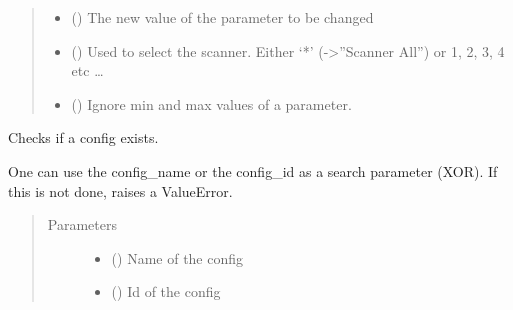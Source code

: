 \documentclass[letterpaper,10pt,english,openany,oneside]{sphinxmanual}
\begin{document}
\begin{fulllineitems}
\begin{fulllineitems}
\begin{quote}
\begin{description}
\begin{itemize}
\item {} 
 () \textendash{} The new value of the parameter to be changed

\item {} 
 () \textendash{} Used to select the scanner. Either ‘*’ (-\textgreater{}”Scanner All”) or 1, 2, 3, 4 etc …

\item {} 
 () \textendash{} Ignore min and max values of a parameter.

\end{itemize}

\end{description}\end{quote}

\end{fulllineitems}


\begin{fulllineitems}
\label{\detokenize{_modules/AconitySTUDIO_client:AconitySTUDIO_client.AconitySTUDIO_client.config_exists}}
Checks if a config exists.

One can  use the config\_name or the config\_id as a search parameter (XOR).
If this is not done, raises a ValueError.
\begin{quote}\begin{description}
\item[{Parameters}] \leavevmode\begin{itemize}
\item {} 
 () \textendash{} Name of the config

\item {} 
 () \textendash{} Id of the config

\end{itemize}


\end{description}
\end{quote}
\end{fulllineitems}
\end{fulllineitems}
\end{document}
